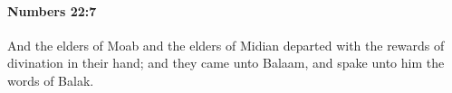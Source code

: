 
		\paragraph{Numbers 22:7} %
			\label{NUMBERS-22-7}

			And the elders of Moab and the elders of Midian departed with the rewards of divination in their hand; and they came unto Balaam, and spake unto him the words of Balak.


